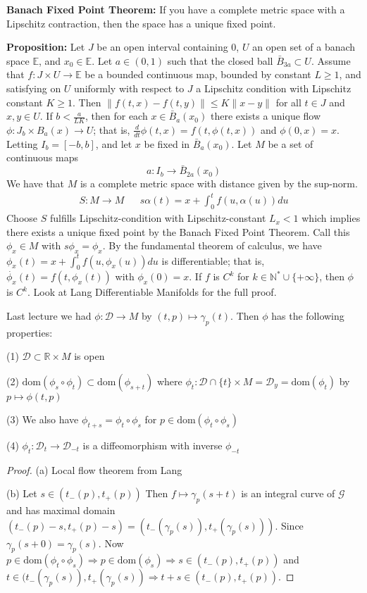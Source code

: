 \documentclass{article}
\begin{document}
\textbf{Banach Fixed Point Theorem:} If you have a complete metric space with a Lipschitz contraction, then the space has a unique fixed point.

\textbf{Proposition:} Let $J$ be an open interval containing $0$, $U$ an open set of a banach space $\mathbb{E}$, and $x_0 \in \mathbb{E}$. Let $a \in (0,1)$ such that the closed ball $\bar{B}_{3a} \subset U$. Assume that $f: J \times U \to \mathbb{E}$ be a bounded continuous map, bounded by constant $L \geq 1$, and satisfying on $U$ uniformly with respect to $J$ a Lipschitz condition with Lipschitz constant $K \geq 1$. Then $\| f(t,x) - f(t,y) \| \leq K \| x - y \|$ for all $t \in J$ and $x,y \in U$. If $b < \frac{a}{LK}$, then for each $x \in \bar{B}_a(x_0)$ there exists a unique flow $\phi: J_b \times B_a(x) \to U$; that is, $\frac{d}{dt}\phi(t,x) = f(t, \phi(t,x))$ and $\phi(0,x) = x$. Letting $I_b = [-b,b]$, and let $x$ be fixed in $\bar{B}_a(x_0)$. Let $M$ be a set of continuous maps
\[
a: I_b \to \bar{B}_{2a}(x_0)
\]
We have that $M$ is a complete metric space with distance given by the sup-norm.
\begin{align*}
S: M \to M && s\alpha(t) = x + \int_0^t f(u,\alpha(u))du
\end{align*}
Choose $S$ fulfills Lipschitz-condition with Lipschitz-constant $L_x < 1$ which implies there exists a unique fixed point by the Banach Fixed Point Theorem. Call this $\phi_x \in M$ with $s\phi_x = \phi_x$. By the fundamental theorem of calculus, we have $\phi_x(t) = x + \int_0^t f(u, \phi_x(u))du$ is differentiable; that is, $\dot{\phi_x}(t) = f(t,\phi_x(t))$ with $\phi_x(0) = x$. If $f$ is $C^k$ for $k \in \mathbb{N}^* \cup \{ +\infty \}$, then $\phi$ is $C^k$. Look at Lang Differentiable Manifolds for the full proof.

Last lecture we had $\phi: \mathcal{D} \to M$ by $(t,p) \mapsto \gamma_p(t)$. Then $\phi$ has the following properties:

(1) $\mathcal{D}\subset \mathbb{R} \times M$ is open

(2) $\text{dom}(\phi_s \circ \phi_t) \subset \text{dom}(\phi_{s + t})$ where $\phi_t :\mathcal{D} \cap \{t\} \times M = \mathcal{D}_y = \text{dom}(\phi_t)$ by $p \mapsto \phi(t,p)$

(3) We also have $\phi_{t+s} = \phi_t \circ \phi_s$ for $p \in \text{dom}(\phi_t \circ \phi_s)$

(4) $\phi_t: \mathcal{D}_t \to \mathcal{D}_{-t}$ is a diffeomorphism with inverse $\phi_{-t}$

\begin{proof}
(a) Local flow theorem from Lang

(b) Let $s \in (t_-(p),t_+(p))$ %
Then $f \mapsto \gamma_p(s+t)$ is an integral curve of $\mathcal{G}$ and has maximal domain 
$(t_-(p) - s,t_+(p) - s) = (t_-(\gamma_p(s)), t_+(\gamma_p(s)))$.
Since $\gamma_p(s+0) = \gamma_p(s)$. Now 
$p \in \text{dom}(\phi_t \circ \phi_s) \Rightarrow p \in \text{dom}(\phi_s) \Rightarrow s \in (t_-(p), t_+(p))$
and $t \in (t_-(\gamma_p(s)),t_+(\gamma_p(s)) \Rightarrow t+s \in (t_-(p), t_+(p))$.

\end{proof}
\end{document}
